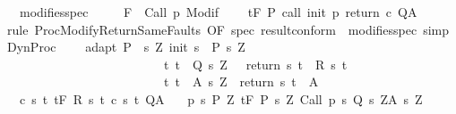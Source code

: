 \begin{isabellebody}
\ \ \ modifies{\isacharunderscore}spec{\isacharcolon}\ \ \isanewline
\ \ {\isachardoublequoteopen}{\isasymforall}{\isasymsigma}{\isachardot}\ {\isasymGamma}{\isacharcomma}{\isasymTheta}{\isasymturnstile}\isactrlbsub {\isacharslash}F\isactrlesub \ {\isacharbraceleft}{\isasymsigma}{\isacharbraceright}\ Call\ p\ {\isacharparenleft}Modif\ {\isasymsigma}{\isacharparenright}{\isacharcomma}{\isacharbraceleft}{\isacharbraceright}{\isachardoublequoteclose}\isanewline
\ \ \ {\isachardoublequoteopen}{\isasymGamma}{\isacharcomma}{\isasymTheta}{\isasymturnstile}\isactrlsub t\isactrlbsub {\isacharslash}F\isactrlesub \ P\ {\isacharparenleft}call\ init\ p\ return\ c{\isacharparenright}\ Q{\isacharcomma}A{\isachardoublequoteclose}\isanewline
%
\isadelimproof
%
\endisadelimproof
%
\isatagproof
{}\isamarkupfalse%
\ {\isacharparenleft}rule\ ProcModifyReturnSameFaults\ {\isacharbrackleft}OF\ spec\ result{\isacharunderscore}conform\ {\isacharunderscore}\ modifies{\isacharunderscore}spec{\isacharbrackright}{\isacharparenright}\ simp%
\endisatagproof
{\isafoldproof}%
%
\isadelimproof
\isanewline
%
\endisadelimproof
\isanewline
\isanewline
{}\isamarkupfalse%
\ DynProc{\isacharcolon}\ \isanewline
\ \ \ adapt{\isacharcolon}\ {\isachardoublequoteopen}P\ {\isasymsubseteq}\ {\isacharbraceleft}s{\isachardot}\ {\isasymexists}Z{\isachardot}\ init\ s\ {\isasymin}\ P{\isacharprime}\ s\ Z\ {\isasymand}\isanewline
\ \ \ \ \ \ \ \ \ \ \ \ \ \ \ \ \ \ \ \ \ \ \ \ \ \ {\isacharparenleft}{\isasymforall}t{\isachardot}\ t\ {\isasymin}\ Q{\isacharprime}\ s\ Z\ {\isasymlongrightarrow}\ \ return\ s\ t\ {\isasymin}\ R\ s\ t{\isacharparenright}\ {\isasymand}\isanewline
\ \ \ \ \ \ \ \ \ \ \ \ \ \ \ \ \ \ \ \ \ \ \ \ \ \ {\isacharparenleft}{\isasymforall}t{\isachardot}\ t\ {\isasymin}\ A{\isacharprime}\ s\ Z\ {\isasymlongrightarrow}\ return\ s\ t\ {\isasymin}\ A{\isacharparenright}{\isacharbraceright}{\isachardoublequoteclose}\isanewline
\ \ \ c{\isacharcolon}\ {\isachardoublequoteopen}{\isasymforall}s\ t{\isachardot}\ {\isasymGamma}{\isacharcomma}{\isasymTheta}{\isasymturnstile}\isactrlsub t\isactrlbsub {\isacharslash}F\isactrlesub \ {\isacharparenleft}R\ s\ t{\isacharparenright}\ {\isacharparenleft}c\ s\ t{\isacharparenright}\ Q{\isacharcomma}A{\isachardoublequoteclose}\isanewline
\ \ \ p{\isacharcolon}\ {\isachardoublequoteopen}{\isasymforall}s{\isasymin}\ P{\isachardot}\ {\isasymforall}Z{\isachardot}\ {\isasymGamma}{\isacharcomma}{\isasymTheta}{\isasymturnstile}\isactrlsub t\isactrlbsub {\isacharslash}F\isactrlesub \ {\isacharparenleft}P{\isacharprime}\ s\ Z{\isacharparenright}\ Call\ {\isacharparenleft}p\ s{\isacharparenright}\ {\isacharparenleft}Q{\isacharprime}\ s\ Z{\isacharparenright}{\isacharcomma}{\isacharparenleft}A{\isacharprime}\ s\ Z{\isacharparenright}{\isachardoublequoteclose}\isanewline

\end{isabellebody}
